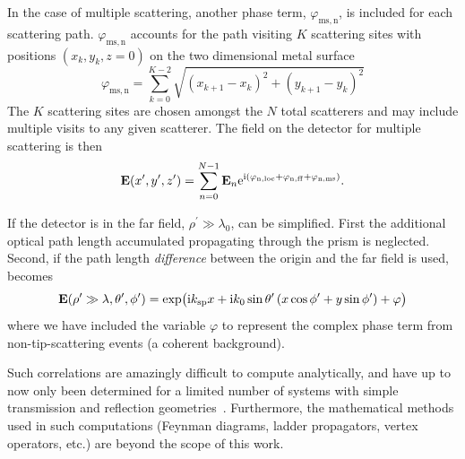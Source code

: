 In the case of multiple scattering, another phase term,
$\varphi_\mathrm{ms,n}$, is included for each scattering path.
$\varphi_\mathrm{ms,n}$ accounts for the path visiting $K$ scattering sites with
positions $(x_k,y_k,z=0)$ on the two dimensional metal surface
\begin{equation}
\varphi_\mathrm{ms,n}=\sum_{k=0}^{K-2} \sqrt{{(x_{k+1}-x_k)}^2+{(y_{k+1}-y_k)}^2}
\end{equation}
The $K$ scattering sites are chosen amongst the $N$ total scatterers and may
include multiple visits to any given scatterer.  The field on the detector for
multiple scattering is then
\begin{equation}
\mathbf{E}(x^\prime,y^\prime,z^\prime) =
\sum_{n=0}^{N-1}
\mathbf{E}_n
{\mathrm{e}}^{{\mathrm{i}}{(\varphi_\mathrm{n,loc}+\varphi_\mathrm{n,ff}+\varphi_\mathrm{n,ms})}}.
\end{equation}



If the detector is in the far field, $\rho^\prime\gg\lambda_0$,
 can be simplified.  First the additional optical
path length accumulated propagating through the prism is neglected.  Second,
if the path length \textit{difference} between the origin and the far field is
used,  becomes
\begin{equation}
\mathbf{E}(\rho^\prime\gg\lambda,\theta^\prime,\phi^\prime) = \exp\!\big( {\mathrm{i}} k_\mathrm{sp} x
 + {\mathrm{i}} k_0 \sin\theta^\prime \left(x\cos\phi^\prime+y\sin\phi^\prime\right)
 + \varphi\big)
	\label{eqn:primarystripes}
\end{equation}
where we have included the variable $\varphi$ to represent the complex phase term
from non-tip-scattering events (a coherent background).  



Such
correlations are amazingly difficult to compute analytically, and have up to
now only been determined for a limited number of systems with simple
transmission and reflection geometries~\cite{berkovits1994correlations}.
Furthermore, the mathematical methods used in such computations (Feynman
diagrams, ladder propagators, vertex operators, etc.) are beyond the scope of
this work.  

